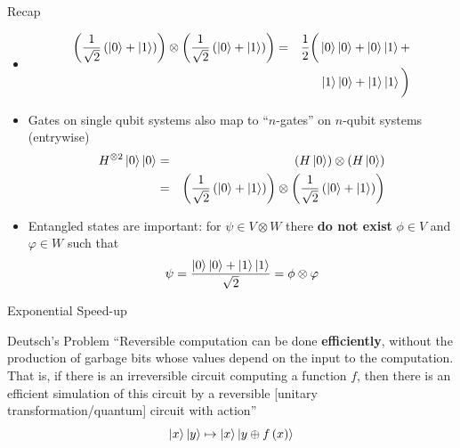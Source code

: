\documentclass{beamer}
\begin{document}
\begin{frame}{Recap}
\begin{itemize}
  \item[] 
    \begin{eqnarray*}
    \left(\frac{1}{\sqrt{2}}\left(\Ket{0}+\Ket{1}\right)\right)\otimes\left(\frac{1}{\sqrt{2}}\left(\Ket{0}+\Ket{1}\right)\right) &=&  \frac{1}{2}\bigg(\Ket{0}\Ket{0}+\Ket{0}\Ket{1}+\\
    &&\Ket{1}\Ket{0}+\Ket{1}\Ket{1}\bigg)
    \end{eqnarray*}
  \item Gates on single qubit systems also map to ``$n$-gates'' on $n$-qubit systems (entrywise)
    \begin{eqnarray*}
      H^{\otimes 2}\Ket{0}\Ket{0} & = & \left(H\Ket{0}\right)\otimes\left(H\Ket{0}\right)\\
                               & = & \left(\frac{1}{\sqrt{2}}\left(\Ket{0}+\Ket{1}\right)\right)\otimes\left(\frac{1}{\sqrt{2}}\left(\Ket{0}+\Ket{1}\right)\right)\\  
    \end{eqnarray*}
  \item Entangled states are important: for $\psi \in V\otimes W$ there \textbf{do not exist} $\phi \in V$ and $\varphi \in W$ such that
    \[
     \psi=\frac{\Ket{0}\Ket{0}+\Ket{1}\Ket{1}}{\sqrt{2}}=\phi\otimes\varphi
    \]
\end{itemize}
\end{frame}


\begin{frame}{\textbf{}}
\begin{center} \Huge Exponential Speed-up \end{center}
\end{frame}

\begin{frame}{Deutsch's Problem}
``Reversible computation can be done \textbf{efficiently}, without the production of garbage bits whose values depend on the input to the computation. That is, if there is an irreversible circuit computing a function $f$, then there is an efficient simulation of this circuit by a reversible [unitary transformation/quantum] circuit with action''\cite{Nielsen:2011:QCQ:1972505}
\[
\Ket{x}\Ket{y}\mapsto\Ket{x}\Ket{y\oplus f\left(x\right)}
\]

\end{frame}
\end{document}
